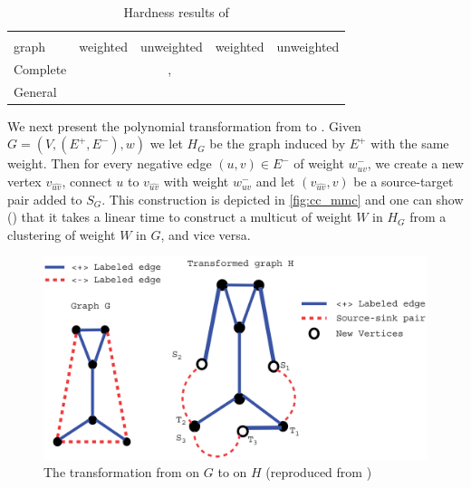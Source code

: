 \begin{table}[tb]
\begin{adjustwidth}{-2cm}{}
   \centering
   \small
   \caption{Hardness results of \pcc{}} \label{tab:cc_cpx}
   \begin{tabulary}{179mm}{lCCCC}
      \toprule
               &    &                                    \\
      \cmidrule(r){2-3}
      \cmidrule(r){4-5}
      graph    & weighted                      & unweighted                                                     & weighted                                                     & unweighted                   \\
      \midrule
      Complete & \APXh{}~\autocite{Charikar2003} & \NPc{}~\autocite{Bansal2002}, \APXh{}~\autocite{Charikar2003}  &                                                              & \NPc{}~\autocite{Bansal2002} \\
      General  & \APXh{}~\autocites{Charikar2003}{Demaine2003} &  \APXh{}~\autocites{Charikar2003}{Emanuel2003}   &  \\
      \bottomrule
   \end{tabulary}
\end{adjustwidth}
\end{table}

We next present the polynomial transformation from \pcc{} to \mmc{}. Given $G=(V, (E^+, E^-), w)$ we let
$H_G$ be the graph induced by $E^+$ with the same weight. Then for every negative edge $(u,v) \in E^-$ of
weight $w_{uv}^-$, we create a new vertex $v_{\widehat{uv}}$, connect $u$ to $v_{\widehat{uv}}$ with
weight $w_{uv}^-$ and let $(v_{\widehat{uv}}, v)$ be a source-target pair added to $S_G$. This
construction is depicted in \autoref{fig:cc_mmc} and one can show (\autocite[Theorem
4.4]{Demaine2006}) that it takes a linear time to construct a
multicut of weight $W$ in $H_G$ from a clustering of weight $W$ in $G$, and vice versa.

\begin{figure}[htpb]
   \centering
   \includegraphics[width=0.8\linewidth]{assets/raw/cc_to_mmc.png}
   \caption{The transformation from \pcc{} on $G$ to \mmc{} on $H$ (reproduced from
   \autocite{Demaine2006}) \label{fig:cc_mmc}}
\end{figure}

